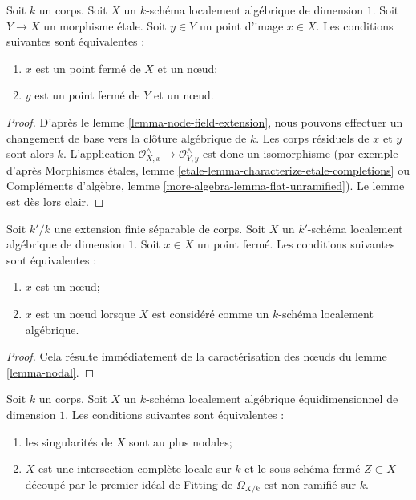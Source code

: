 \begin{lemma}
\label{lemma-node-etale-local}
Soit $k$ un corps. Soit $X$ un $k$-schéma localement algébrique de dimension $1$. Soit $Y \to X$ un morphisme étale. Soit $y \in Y$ un point d'image $x \in X$. Les conditions suivantes sont équivalentes : \begin{enumerate} \item $x$ est un point fermé de $X$ et un nœud; \item $y$ est un point fermé de $Y$ et un nœud.
\end{enumerate}
\end{lemma}

\begin{proof}
D'après le lemme \ref{lemma-node-field-extension}, nous pouvons effectuer un changement de base vers la clôture algébrique de $k$. Les corps résiduels de $x$ et $y$ sont alors $k$. L'application $\mathcal{O}_{X, x}^\wedge \to \mathcal{O}_{Y, y}^\wedge$ est donc un isomorphisme (par exemple d'après Morphismes étales, lemme \ref{etale-lemma-characterize-etale-completions} ou Compléments d'algèbre, lemme \ref{more-algebra-lemma-flat-unramified}). Le lemme est dès lors clair.
\end{proof}

\begin{lemma}
\label{lemma-node-over-separable-extension}
Soit $k'/k$ une extension finie séparable de corps. Soit $X$ un $k'$-schéma localement algébrique de dimension $1$. Soit $x \in X$ un point fermé. Les conditions suivantes sont équivalentes : \begin{enumerate} \item $x$ est un nœud; \item $x$ est un nœud lorsque $X$ est considéré comme un $k$-schéma localement algébrique.
\end{enumerate}
\end{lemma}

\begin{proof}
Cela résulte immédiatement de la caractérisation des nœuds du lemme \ref{lemma-nodal}.
\end{proof}

\begin{lemma}
\label{lemma-nodal-lci}
Soit $k$ un corps. Soit $X$ un $k$-schéma localement algébrique équidimensionnel de dimension $1$. Les conditions suivantes sont équivalentes : \begin{enumerate} \item les singularités de $X$ sont au plus nodales; \item $X$ est une intersection complète locale sur $k$ et le sous-schéma fermé $Z \subset X$ découpé par le premier idéal de Fitting de $\Omega_{X/k}$ est non ramifié sur $k$.
\end{enumerate}
\end{lemma}

